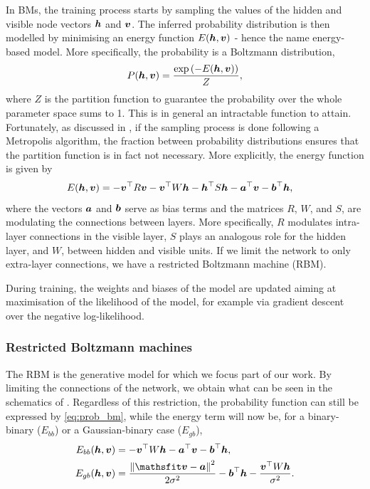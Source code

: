 In BMs, the training process starts by sampling the values of the hidden and visible node vectors $\boldsymbol{h}$ and $\boldsymbol{v}$. The inferred probability distribution is then modelled by minimising an energy function $E(\boldsymbol{h}, \boldsymbol{v})$ - hence the name energy-based model. More specifically, the probability is a Boltzmann distribution,
\begin{align}
    P(\boldsymbol{h}, \boldsymbol{v}) = \frac{\exp{(-E(\boldsymbol{h}, \boldsymbol{v}))} }{Z},
    \label{eq:prob_bm}
\end{align}
where $Z$ is the partition function to guarantee the probability over the whole parameter space sums to 1. This is in general an intractable function to attain. Fortunately, as discussed in , if the sampling process is done following a Metropolis algorithm, the fraction between probability distributions ensures that the partition function is in fact not necessary. More explicitly, the energy function is given by
\begin{align*}
    E(\boldsymbol{h}, \boldsymbol{v}) &= -\boldsymbol{v}^\top R\boldsymbol{v}-\boldsymbol{v}^\top W\boldsymbol{h}-\boldsymbol{h}^\top S\boldsymbol{h}-\boldsymbol{a}^\top\boldsymbol{v}-\boldsymbol{b}^\top\boldsymbol{h},
\end{align*}
where the vectors $\boldsymbol{a}$ and $\boldsymbol{b}$ serve as bias terms and the matrices $R$, $W$, and $S$, are modulating the connections between layers. More specifically, $R$ modulates intra-layer connections in the visible layer, $S$ plays an analogous role for the hidden layer, and $W$, between hidden and visible units. If we limit the network to only extra-layer connections, we have a restricted Boltzmann machine (RBM).

During training, the weights and biases of the model are updated aiming at maximisation of the likelihood of the model, for example via gradient descent over the negative log-likelihood.

\subsubsection{Restricted Boltzmann machines}\label{sec:rbm}



The RBM is the generative model for which we focus part of our work. By limiting the connections of the network, we obtain what can be seen in the schematics of . Regardless of this restriction, the probability function can still be expressed by  \eqref{eq:prob_bm}, while the energy term will now be, for a binary-binary ($E_{bb}$) or a Gaussian-binary case ($E_{gb}$),
\begin{align*}
    E_{bb}(\mvec{h}, \mvec{v}) &= -\mvec{v}^\top W\mvec{h}-\mvec{a}^\top\mvec{v}-\mvec{b}^\top\mvec{h}, \\
    E_{gb}(\mvec{h}, \mvec{v}) &=\frac{\norm{\mvec{v} - \mvec{a}}^2}{2\sigma^2}-\mvec{b}^\top\mvec{h} - \frac{\mvec{v}^\top W\mvec{h}}{\sigma^2}.
\end{align*}

